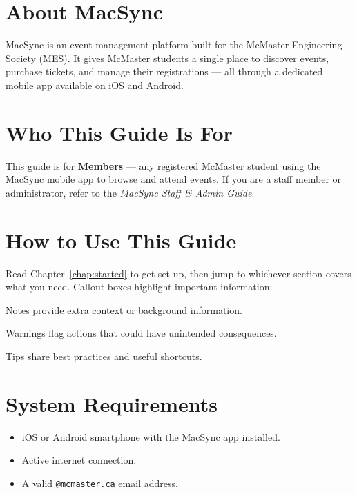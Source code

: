 \documentclass[12pt, twoside]{report}
\begin{document}
\section{About MacSync}

MacSync is an event management platform built for the McMaster Engineering Society (MES).
It gives McMaster students a single place to discover events, purchase tickets, and
manage their registrations --- all through a dedicated mobile app available on iOS
and Android.

\section{Who This Guide Is For}

This guide is for \textbf{Members} --- any registered McMaster student using the
MacSync mobile app to browse and attend events. If you are a staff member or
administrator, refer to the \textit{MacSync Staff \& Admin Guide}.

\section{How to Use This Guide}

Read Chapter~\ref{chap:started} to get set up, then jump to whichever section
covers what you need. Callout boxes highlight important information:

\begin{notebox}
Notes provide extra context or background information.
\end{notebox}

\begin{warnbox}
Warnings flag actions that could have unintended consequences.
\end{warnbox}

\begin{tipbox}
Tips share best practices and useful shortcuts.
\end{tipbox}

\section{System Requirements}
\begin{itemize}
  \item iOS or Android smartphone with the MacSync app installed.
  \item Active internet connection.
  \item A valid \texttt{@mcmaster.ca} email address.
\end{itemize}
\end{document}

